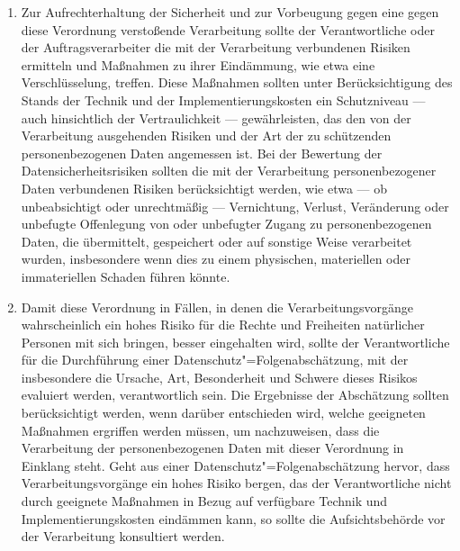 \begin{enumerate}

   \item Zur Aufrechterhaltung der Sicherheit und zur Vorbeugung gegen eine gegen diese Verordnung verstoßende
    Verarbeitung sollte der Verantwortliche oder der Auftragsverarbeiter die mit der Verarbeitung verbundenen Risiken
    ermitteln und Maßnahmen zu ihrer Eindämmung, wie etwa eine Verschlüsselung, treffen. Diese Maßnahmen sollten unter
    Berücksichtigung des Stands der Technik und der Implementierungskosten ein Schutzniveau — auch hinsichtlich der
    Vertraulichkeit — gewährleisten, das den von der Verarbeitung ausgehenden Risiken und der Art der zu schützenden
    personenbezogenen Daten angemessen ist. Bei der Bewertung der Datensicherheitsrisiken sollten die mit der
    Verarbeitung personenbezogener Daten verbundenen Risiken berücksichtigt werden, wie etwa — ob unbeabsichtigt oder
    unrechtmäßig — Vernichtung, Verlust, Veränderung oder unbefugte Offenlegung von oder unbefugter Zugang zu
    personenbezogenen Daten, die übermittelt, gespeichert oder auf sonstige Weise verarbeitet wurden, insbesondere wenn
    dies zu einem physischen, materiellen oder immateriellen Schaden führen könnte.%
   \label{eg:83}
   

   \item Damit diese Verordnung in Fällen, in denen die Verarbeitungsvorgänge wahrscheinlich ein hohes Risiko für die
    Rechte und Freiheiten natürlicher Personen mit sich bringen, besser eingehalten wird, sollte der Verantwortliche
    für die Durchführung einer Datenschutz"=Folgenabschätzung, mit der insbesondere die Ursache, Art, Besonderheit und
    Schwere dieses Risikos evaluiert werden, verantwortlich sein. Die Ergebnisse der Abschätzung sollten berücksichtigt
    werden, wenn darüber entschieden wird, welche geeigneten Maßnahmen ergriffen werden müssen, um nachzuweisen, dass
    die Verarbeitung der personenbezogenen Daten mit dieser Verordnung in Einklang steht. Geht aus einer
    Datenschutz"=Folgenabschätzung hervor, dass Verarbeitungsvorgänge ein hohes Risiko bergen, das der Verantwortliche
    nicht durch geeignete Maßnahmen in Bezug auf verfügbare Technik und Implementierungskosten eindämmen kann, so
    sollte die Aufsichtsbehörde vor der Verarbeitung konsultiert werden.%
   \label{eg:84}
   


\end{enumerate}
